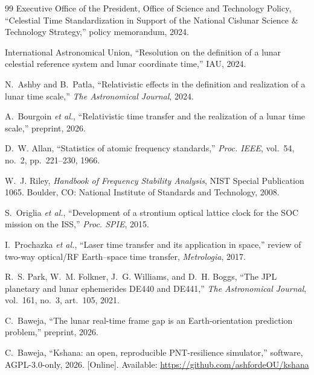\documentclass[conference]{IEEEtran}
\begin{document}
\begin{thebibliography}{99}
 Executive Office of the President, Office of Science and
Technology Policy, ``Celestial Time Standardization in Support of the National
Cislunar Science \& Technology Strategy,'' policy memorandum, 2024.

 International Astronomical Union, ``Resolution on the definition
of a lunar celestial reference system and lunar coordinate time,'' IAU, 2024.

 N.~Ashby and B.~Patla, ``Relativistic effects in the definition
and realization of a lunar time scale,'' \emph{The Astronomical Journal}, 2024.

 A.~Bourgoin \emph{et al.}, ``Relativistic time transfer and
the realization of a lunar time scale,'' preprint, 2026.

 D.~W. Allan, ``Statistics of atomic frequency standards,''
\emph{Proc. IEEE}, vol.~54, no.~2, pp.~221--230, 1966.

 W.~J. Riley, \emph{Handbook of Frequency Stability Analysis},
NIST Special Publication 1065. Boulder, CO: National Institute of Standards and
Technology, 2008.

 S.~Origlia \emph{et al.}, ``Development of a strontium
optical lattice clock for the SOC mission on the ISS,'' \emph{Proc. SPIE}, 2015.

 I.~Prochazka \emph{et al.}, ``Laser time transfer and its
application in space,'' review of two-way optical/RF Earth--space time transfer,
\emph{Metrologia}, 2017.

 R.~S. Park, W.~M. Folkner, J.~G. Williams, and D.~H. Boggs, ``The
JPL planetary and lunar ephemerides DE440 and DE441,'' \emph{The Astronomical
Journal}, vol.~161, no.~3, art.~105, 2021.

 C.~Baweja, ``The lunar real-time frame gap is an
Earth-orientation prediction problem,'' preprint, 2026.

 C.~Baweja, ``Kshana: an open, reproducible PNT-resilience
simulator,'' software, AGPL-3.0-only, 2026. [Online]. Available:
\url{https://github.com/ashfordeOU/kshana}
\end{thebibliography}
\end{document}
